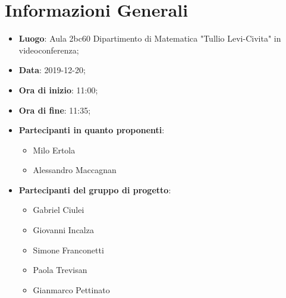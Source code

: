 \section{Informazioni Generali}
	\begin{itemize}
		\item \textbf {Luogo}: Aula 2bc60 Dipartimento di Matematica "Tullio Levi-Civita" in videoconferenza;
		\item \textbf {Data}: 2019-12-20;
		\item \textbf {Ora di inizio}: 11:00;
		\item \textbf {Ora di fine}: 11:35;
		\item \textbf {Partecipanti in quanto proponenti}:
		  \begin{itemize}
		    \item Milo Ertola
		    \item Alessandro Maccagnan
		  \end{itemize}
		\item \textbf {Partecipanti del gruppo di progetto}:
			\begin{itemize}
				\item Gabriel Ciulei
				\item Giovanni Incalza
				\item Simone Franconetti
				\item Paola Trevisan
				\item Gianmarco Pettinato
			\end{itemize}
	\end{itemize}

